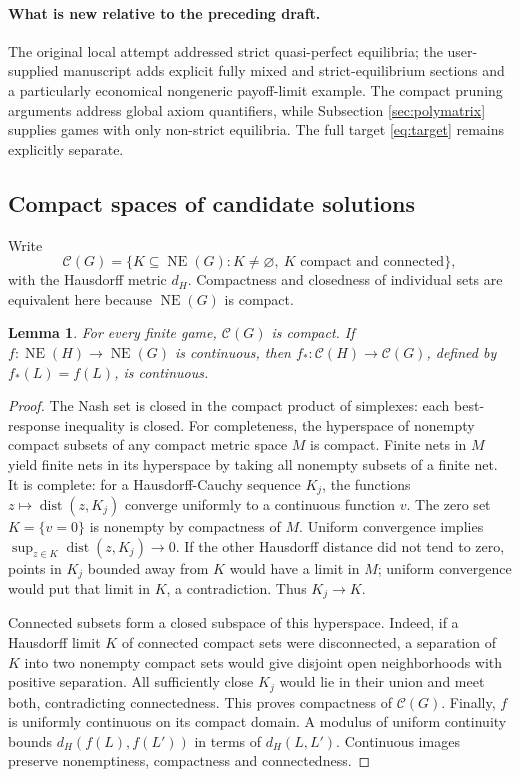 \documentclass[11pt]{article}
\newtheorem{lemma}[theorem]{Lemma}
\theoremstyle{definition}
\newcommand{\NE}{\operatorname{NE}}
\newcommand{\CC}{\mathscr C}
\newcommand{\dist}{\operatorname{dist}}
\begin{document}
\paragraph{What is new relative to the preceding draft.}
The original local attempt addressed strict quasi-perfect equilibria; the
user-supplied manuscript adds explicit fully mixed and strict-equilibrium
sections and a particularly economical nongeneric payoff-limit example.
The compact pruning arguments address global axiom quantifiers, while
Subsection \ref{sec:polymatrix} supplies games with only non-strict equilibria.
The full target \eqref{eq:target} remains explicitly separate.

\subsection{Compact spaces of candidate solutions}\label{sec:compact}
Write
\[
 \CC(G)=\{K\subseteq\NE(G):K\ne\varnothing,\ K\text{ compact and connected}\},
\]
with the Hausdorff metric $d_H$. Compactness and closedness of individual sets
are equivalent here because $\NE(G)$ is compact.

\begin{lemma}\label{lem:hyperspace}
For every finite game, $\CC(G)$ is compact. If
$f:\NE(H)\to\NE(G)$ is continuous, then
$f_*:\CC(H)\to\CC(G)$, defined by $f_*(L)=f(L)$, is continuous.
\end{lemma}
\begin{proof}
The Nash set is closed in the compact product of simplexes: each best-response
inequality is closed. For completeness, the hyperspace of nonempty compact
subsets of any compact metric space $M$ is compact. Finite nets in $M$ yield
finite nets in its hyperspace by taking all nonempty subsets of a finite net.
It is complete: for a Hausdorff-Cauchy sequence $K_j$, the functions
$z\mapsto\dist(z,K_j)$ converge uniformly to a continuous function $v$.
The zero set $K=\{v=0\}$ is nonempty by compactness of $M$. Uniform convergence
implies $\sup_{z\in K}\dist(z,K_j)\to0$. If the other Hausdorff distance did
not tend to zero, points in $K_j$ bounded away from $K$ would have a limit in
$M$; uniform convergence would put that limit in $K$, a contradiction.
Thus $K_j\to K$.

Connected subsets form a closed subspace of this hyperspace. Indeed, if a
Hausdorff limit $K$ of connected compact sets were disconnected, a separation
of $K$ into two nonempty compact sets would give disjoint open neighborhoods
with positive separation. All sufficiently close $K_j$ would lie in their
union and meet both, contradicting connectedness. This proves compactness of
$\CC(G)$. Finally, $f$ is uniformly continuous on its compact domain. A modulus
of uniform continuity bounds $d_H(f(L),f(L'))$ in terms of $d_H(L,L')$.
Continuous images preserve nonemptiness, compactness and connectedness.
\end{proof}
\end{document}
